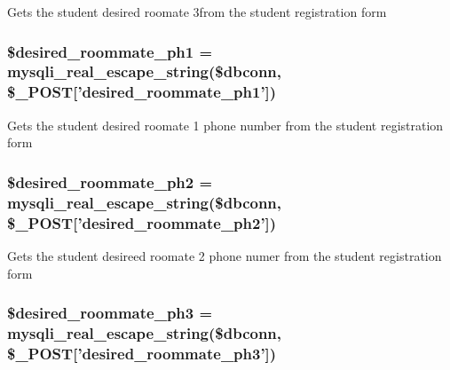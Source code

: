 \-Gets the student desired roomate 3from the student registration form \hypertarget{user__view_2validate_2studentVal_8php_a16c9576f781eff1e7ea69dfb51ee308c}{
\subsubsection[{\$desired\-\_\-roommate\-\_\-ph1}]{\setlength{\rightskip}{0pt plus 5cm}\$desired\-\_\-roommate\-\_\-ph1 = mysqli\-\_\-real\-\_\-escape\-\_\-string(\$dbconn, \$\-\_\-\-P\-O\-S\-T\mbox{[}'desired\-\_\-roommate\-\_\-ph1'\mbox{]})}}\label{user__view_2validate_2studentVal_8php_a16c9576f781eff1e7ea69dfb51ee308c}
\-Gets the student desired roomate 1 phone number from the student registration form \hypertarget{user__view_2validate_2studentVal_8php_ad955a7541f031fbdf7a0bc5546bdd541}{
\subsubsection[{\$desired\-\_\-roommate\-\_\-ph2}]{\setlength{\rightskip}{0pt plus 5cm}\$desired\-\_\-roommate\-\_\-ph2 = mysqli\-\_\-real\-\_\-escape\-\_\-string(\$dbconn, \$\-\_\-\-P\-O\-S\-T\mbox{[}'desired\-\_\-roommate\-\_\-ph2'\mbox{]})}}\label{user__view_2validate_2studentVal_8php_ad955a7541f031fbdf7a0bc5546bdd541}
\-Gets the student desireed roomate 2 phone numer from the student registration form \hypertarget{user__view_2validate_2studentVal_8php_aa8370cdba5dc6efab40e588b41321612}{
\subsubsection[{\$desired\-\_\-roommate\-\_\-ph3}]{\setlength{\rightskip}{0pt plus 5cm}\$desired\-\_\-roommate\-\_\-ph3 = mysqli\-\_\-real\-\_\-escape\-\_\-string(\$dbconn, \$\-\_\-\-P\-O\-S\-T\mbox{[}'desired\-\_\-roommate\-\_\-ph3'\mbox{]})}}\label{user__view_2validate_2studentVal_8php_aa8370cdba5dc6efab40e588b41321612}
